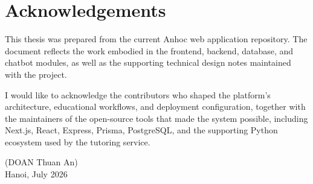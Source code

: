 \documentclass[12pt,a4paper,twoside]{book}
\newcommand{\thesisstudent}{DOAN Thuan An}
\newcommand{\thesislocation}{Hanoi}
\newcommand{\thesismonthyear}{July 2026}
\begin{document}
\chapter*{Acknowledgements}
\thispagestyle{plain}
This thesis was prepared from the current Anhoc web application repository. The document reflects
the work embodied in the frontend, backend, database, and chatbot modules, as well as the
supporting technical design notes maintained with the project.

I would like to acknowledge the contributors who shaped the platform's architecture, educational
workflows, and deployment configuration, together with the maintainers of the open-source tools
that made the system possible, including Next.js, React, Express, Prisma, PostgreSQL, and the
supporting Python ecosystem used by the tutoring service.

\vfill
\begin{flushright}
(\thesisstudent)\\
\thesislocation, \thesismonthyear
\end{flushright}
\clearpage
\hypersetup{linkcolor=black}

\tableofcontents
\thispagestyle{plain}
\clearpage
\end{document}
